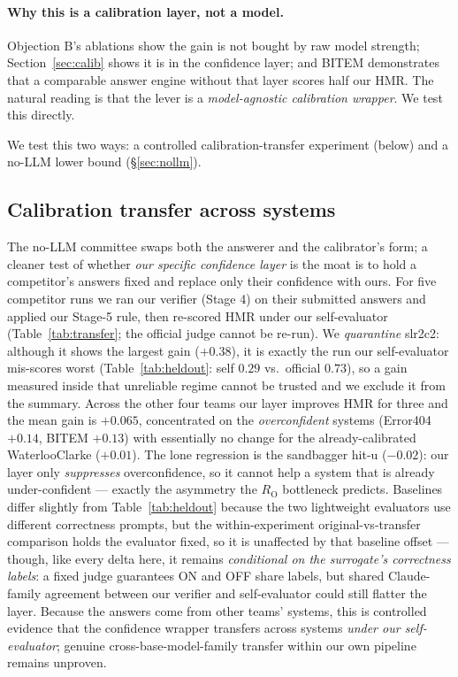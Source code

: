 \documentclass[sigconf,nonacm]{acmart}
\newcommand{\HMR}{\textsc{HMR}}
\newcommand{\RO}{R_{\mathrm{O}}}
\begin{document}
\paragraph{Why this is a calibration layer, not a model.} Objection B's ablations show the
gain is not bought by raw model strength; Section~\ref{sec:calib} shows it is in the
confidence layer; and BITEM demonstrates that a comparable answer engine without that layer
scores half our \HMR. The natural reading is that the lever is a \emph{model-agnostic
calibration wrapper}. We test this directly.

We test this two ways: a controlled calibration-transfer experiment (below) and a no-LLM
lower bound (\S\ref{sec:nollm}).

\subsection{Calibration transfer across systems}
\label{sec:transfer}
The no-LLM committee swaps both the answerer and the calibrator's form; a cleaner test of
whether \emph{our specific confidence layer} is the moat is to hold a competitor's answers
fixed and replace only their confidence with ours. For five competitor runs we ran our
verifier (Stage 4) on their submitted answers and applied our Stage-5 rule, then re-scored
\HMR{} under our self-evaluator (Table~\ref{tab:transfer}; the official judge cannot be
re-run). We \emph{quarantine} slr2c2: although it shows the largest gain ($+0.38$), it is
exactly the run our self-evaluator mis-scores worst (Table~\ref{tab:heldout}: self $0.29$
vs.\ official $0.73$), so a gain measured inside that unreliable regime cannot be trusted and
we exclude it from the summary. Across the other four teams our layer improves \HMR{} for
three and the mean gain is $+0.065$, concentrated on the \emph{overconfident} systems
(Error404 $+0.14$, BITEM $+0.13$) with essentially no change for the already-calibrated
WaterlooClarke ($+0.01$). The lone regression is the sandbagger hit-u ($-0.02$): our layer
only \emph{suppresses} overconfidence, so it cannot help a system that is already
under-confident --- exactly the asymmetry the $\RO$ bottleneck predicts. Baselines differ
slightly from Table~\ref{tab:heldout} because the two lightweight evaluators use different
correctness prompts, but the within-experiment original-vs-transfer comparison holds the
evaluator fixed, so it is unaffected by that baseline offset --- though, like every delta
here, it remains \emph{conditional on the surrogate's correctness labels}: a fixed judge
guarantees ON and OFF share labels, but shared Claude-family agreement between our verifier
and self-evaluator could still flatter the layer. Because the answers come from other teams'
systems, this is controlled evidence that the confidence wrapper transfers across systems
\emph{under our self-evaluator}; genuine cross-base-model-family transfer within our own
pipeline remains unproven.
\end{document}
